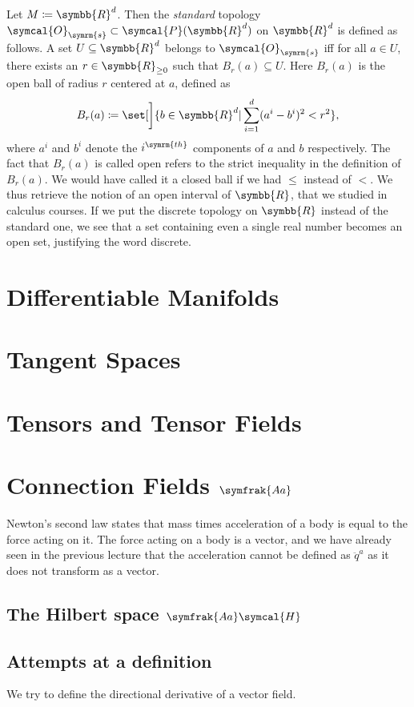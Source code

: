 \documentclass[a4 paper, 12pt]{book}
\theoremstyle{definition}
\newcommand{\rr}{\symbb{R}}
\newcommand{\topology}{\symcal{O}}
\newcommand{\powerset}{\symcal{P}}
\newcommand{\ball}{B}
\begin{document}
    Let \(M \coloneq \rr^d\). Then the \textit{standard} topology \(\topology_{\symrm{s}} \subset \powerset(\rr^d)\) on \(\rr^d\) is defined as follows. A set \(U \subseteq \rr^d\) belongs to \(\topology_{\symrm{s}}\) iff for all \(a \in U\), there exists an \(r \in \rr_{\geq 0}\) such that \(\ball_r(a) \subseteq U\). Here \(\ball_r(a)\) is the open ball of radius \(r\) centered at \(a\), defined as 
    \[
        \ball_r(a) \coloneq \set[\bigg]{b \in \rr^d | \sum_{i=1}^d (a^i - b^i)^2 < r^2},
    \] 
    where \(a^i\) and \(b^i\) denote the \(i^{\symrm{th}}\) components of \(a\) and \(b\) respectively. The fact that \(\ball_r(a)\) is called open refers to the strict inequality in the definition of \(\ball_r(a)\). We would have called it a closed ball if we had \(\leq\) instead of \(<\). We thus retrieve the notion of an open interval of \(\rr\), that we studied in calculus courses. If we put the discrete topology on \(\rr\) instead of the standard one, we see that a set containing even a single real number becomes an open set, justifying the word discrete.

    \chapter{Differentiable Manifolds}

    \chapter{Tangent Spaces}

    \chapter{Tensors and Tensor Fields}
    
    \chapter{Connection Fields \texorpdfstring{\(\symfrak{Aa}\)}{PDFstring}}

    Newton's second law states that mass times acceleration of a body is equal to the force acting on it. The force acting on a body is a vector, and we have already seen in the previous lecture that the acceleration cannot be defined as \(\ddot q^a\) as it does not transform as a vector.

    \section{The Hilbert space \texorpdfstring{\(\symfrak{Aa}\symcal{H}\)}{PDFstring}}

    \section{Attempts at a definition}

    We try to define the directional derivative of a vector field. 
    
    \nocite{*}
    \printbibliography[heading=bibintoc]
\end{document}
